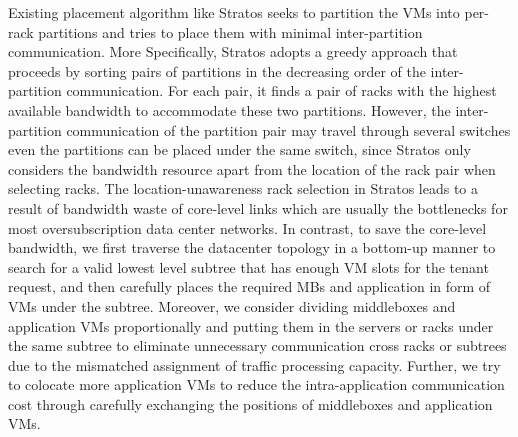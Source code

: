 \documentclass[review]{elsarticle}
\begin{document}
Existing placement algorithm like Stratos \cite{stratos12} seeks to partition the VMs into per-rack partitions and tries to place them with minimal inter-partition communication. More Specifically, 
Stratos adopts a greedy approach that proceeds by sorting pairs of partitions in the decreasing
order of the inter-partition communication. For each pair, it finds a pair of racks with the highest available bandwidth to accommodate
these two partitions. However, the inter-partition communication of the partition pair may travel through several switches %
even the partitions can be placed under the same switch, since Stratos only considers the bandwidth resource apart from the location of the rack pair when selecting racks. The location-unawareness rack selection in Stratos leads to a result of bandwidth waste of core-level links which are usually the bottlenecks for most oversubscription data center networks. %
In contrast, %
to save the core-level bandwidth,
we first traverse the datacenter topology in a bottom-up manner to search for a valid lowest level subtree \cite{B11tpd} that has enough VM slots for the tenant request, and then carefully places the required MBs and application in form of VMs under the subtree. 
Moreover, 
we consider dividing middleboxes and application VMs proportionally and putting them in the servers or racks under the same subtree to eliminate unnecessary communication cross racks or subtrees due to the mismatched assignment of traffic processing capacity. Further, we try to colocate more application VMs to reduce the intra-application communication cost through carefully exchanging the positions of middleboxes and application VMs.
\end{document}
